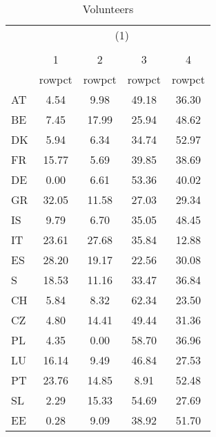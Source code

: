 \begin{table}[htbp]\centering
\def\sym#1{\ifmmode^{#1}\else\(^{#1}\)\fi}
\caption{Volunteers}
\begin{tabular}{l*{4}{c}}
\hline\hline
            &\multicolumn{4}{c}{(1)}                            \\
            &\multicolumn{4}{c}{}                               \\
            &           1&           2&           3&           4\\
            &      rowpct&      rowpct&      rowpct&      rowpct\\
\hline
AT          &        4.54&        9.98&       49.18&       36.30\\
BE          &        7.45&       17.99&       25.94&       48.62\\
DK          &        5.94&        6.34&       34.74&       52.97\\
FR          &       15.77&        5.69&       39.85&       38.69\\
DE          &        0.00&        6.61&       53.36&       40.02\\
GR          &       32.05&       11.58&       27.03&       29.34\\
IS          &        9.79&        6.70&       35.05&       48.45\\
IT          &       23.61&       27.68&       35.84&       12.88\\
ES          &       28.20&       19.17&       22.56&       30.08\\
S           &       18.53&       11.16&       33.47&       36.84\\
CH          &        5.84&        8.32&       62.34&       23.50\\
CZ          &        4.80&       14.41&       49.44&       31.36\\
PL          &        4.35&        0.00&       58.70&       36.96\\
LU          &       16.14&        9.49&       46.84&       27.53\\
PT          &       23.76&       14.85&        8.91&       52.48\\
SL          &        2.29&       15.33&       54.69&       27.69\\
EE          &        0.28&        9.09&       38.92&       51.70\\
\hline\hline
\end{tabular}
\end{table}
